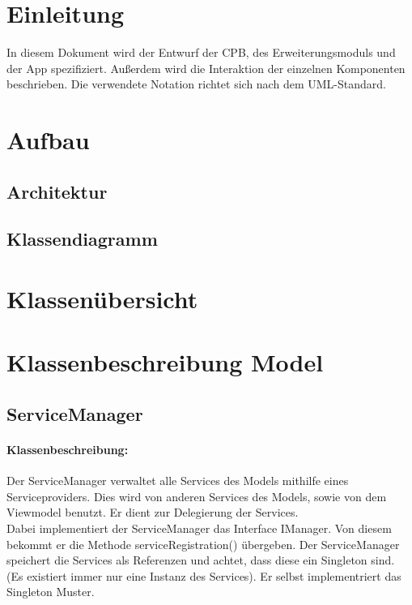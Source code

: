 \documentclass[a4paper,12pt]{article}
\title{\projektName}
\date{\today}
\author{Tec O'Brain}
\begin{document}
 \setcounter{page}{2}
 \tableofcontents          %
 \clearpage

\section{Einleitung}
In diesem Dokument wird der Entwurf der \Gls{CPB}, des Erweiterungsmoduls und der App spezifiziert. Außerdem wird die Interaktion der einzelnen Komponenten beschrieben.
Die verwendete Notation richtet sich nach dem UML-Standard.

\section{Aufbau}
    \subsection{Architektur}
    \subsection{Klassendiagramm}


\section{Klassenübersicht}
\section{Klassenbeschreibung Model}
\subsection{ServiceManager}
	\paragraph{Klassenbeschreibung:}
	Der ServiceManager verwaltet alle Services des Models mithilfe eines Serviceproviders. Dies wird von anderen Services des Models, sowie von dem Viewmodel benutzt. Er dient zur Delegierung der Services.\\ 
	Dabei implementiert der ServiceManager das Interface IManager.
	Von diesem bekommt er die Methode serviceRegistration() übergeben.
	Der ServiceManager speichert die Services als Referenzen und achtet, dass diese ein Singleton sind. (Es existiert immer nur eine Instanz des Services).
	Er selbst implementriert das Singleton Muster.
	
\end{document}
